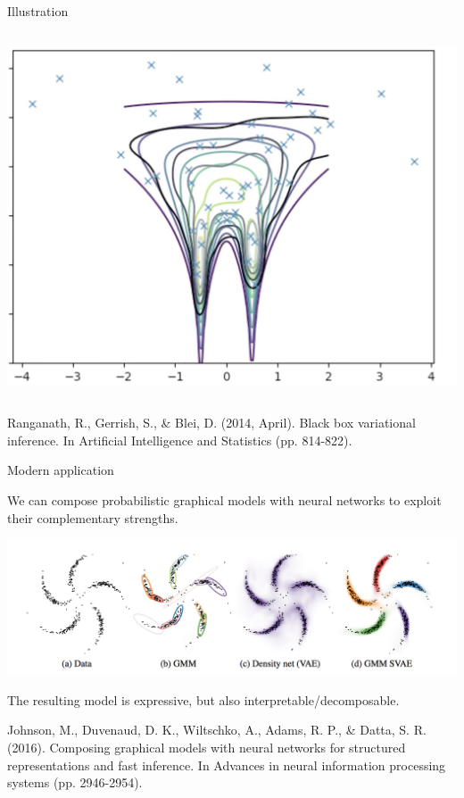 \documentclass[10pt]{beamer}
\newcommand{\+}[1]{\ensuremath{{\boldsymbol #1}}} %
\begin{document}
\begin{frame}{Illustration}
\begin{minipage}[t][.9\textheight]{\textwidth}
\begin{columns}[t]
\includegraphics[width=.7\textwidth]{images/intro_animation_4.png}
\end{columns}

\vfill

\tiny Ranganath, R., Gerrish, S., \& Blei, D. (2014, April). Black box variational inference. In Artificial Intelligence and Statistics (pp. 814-822).
  \end{minipage}
  
\end{frame}

\begin{frame}{Modern application}

  \begin{minipage}[t][.9\textheight]{\textwidth}

We can compose probabilistic graphical models with neural networks to exploit their complementary strengths.  

\vspace{.2in}

\centering
\includegraphics[width=.95\textwidth]{images/composing_pgms_with_nns}

\vspace{.2in}

The resulting model is expressive, but also interpretable/decomposable.\\

    \vfill

\tiny Johnson, M., Duvenaud, D. K., Wiltschko, A., Adams, R. P., \& Datta, S. R. (2016). Composing graphical models with neural networks for structured representations and fast inference. In Advances in neural information processing systems (pp. 2946-2954).

  \end{minipage}
  
\end{frame}
\end{document}
